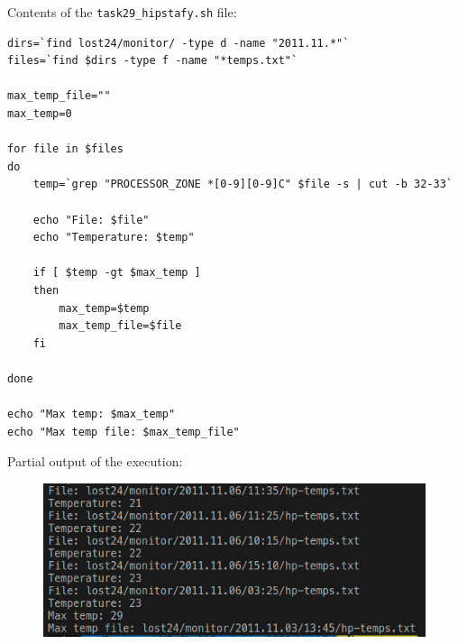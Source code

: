 \documentclass[9pt]{article}
\begin{document}
\begin{enumerate}
        Contents of the \texttt{task29\_hipstafy.sh} file:
        \begin{lstlisting}
dirs=`find lost24/monitor/ -type d -name "2011.11.*"`
files=`find $dirs -type f -name "*temps.txt"`

max_temp_file=""
max_temp=0

for file in $files
do
    temp=`grep "PROCESSOR_ZONE *[0-9][0-9]C" $file -s | cut -b 32-33`
    
    echo "File: $file"
    echo "Temperature: $temp"

    if [ $temp -gt $max_temp ]
    then
        max_temp=$temp
        max_temp_file=$file
    fi

done

echo "Max temp: $max_temp"
echo "Max temp file: $max_temp_file"
        \end{lstlisting}

        Partial output of the execution:
        \begin{figure}[h!]
            \centering
            \includegraphics[width=12cm]{img/30.png}
        \end{figure}

\end{enumerate}
\end{document}
